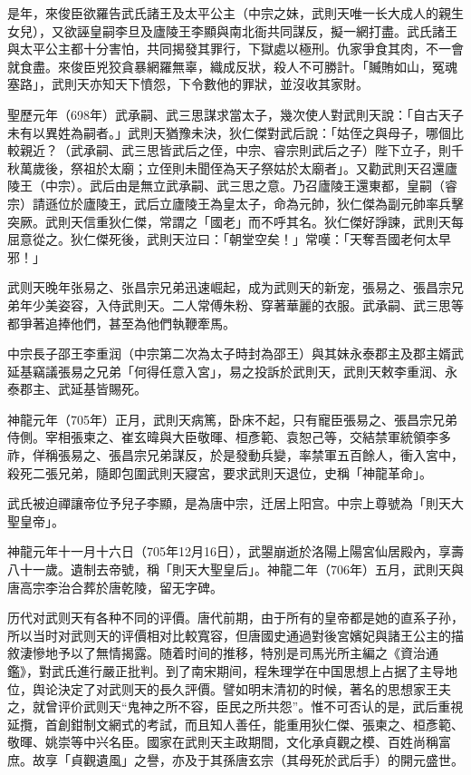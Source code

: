 是年，來俊臣欲羅告武氏諸王及太平公主（中宗之妹，武則天唯一长大成人的親生女兒），又欲誣皇嗣李旦及廬陵王李顯與南北衙共同謀反，擬一網打盡。武氏諸王與太平公主都十分害怕，共同揭發其罪行，下獄處以極刑。仇家爭食其肉，不一會就食盡。來俊臣兇狡貪暴網羅無辜，織成反狀，殺人不可勝計。「贓賄如山，冤魂塞路」，武則天亦知天下憤怨，下令數他的罪狀，並沒收其家財。

聖歷元年（698年）武承嗣、武三思謀求當太子，幾次使人對武則天說：「自古天子未有以異姓為嗣者。」武則天猶豫未決，狄仁傑對武后說：「姑侄之與母子，哪個比較親近？（武承嗣、武三思皆武后之侄，中宗、睿宗則武后之子）陛下立子，則千秋萬歲後，祭祖於太廟；立侄則未聞侄為天子祭姑於太廟者」。又勸武則天召還廬陵王（中宗）。武后由是無立武承嗣、武三思之意。乃召廬陵王還東都，皇嗣（睿宗）請遜位於廬陵王，武后立廬陵王為皇太子，命為元帥，狄仁傑為副元帥率兵擊突厥。武則天信重狄仁傑，常謂之「國老」而不呼其名。狄仁傑好諍諫，武則天每屈意從之。狄仁傑死後，武則天泣曰：「朝堂空矣！」常嘆：「天奪吾國老何太早邪！」

武则天晚年张易之、张昌宗兄弟迅速崛起，成为武则天的新宠，張易之、張昌宗兄弟年少美姿容，入侍武則天。二人常傅朱粉、穿著華麗的衣服。武承嗣、武三思等都爭著追捧他們，甚至為他們執鞭牽馬。

中宗長子邵王李重润（中宗第二次為太子時封為邵王）與其妹永泰郡主及郡主婿武延基竊議張易之兄弟「何得任意入宮」，易之投訴於武則天，武則天敕李重润、永泰郡主、武延基皆賜死。

神龍元年（705年）正月，武則天病篤，卧床不起，只有寵臣張易之、張昌宗兄弟侍側。宰相張柬之、崔玄暐與大臣敬暉、桓彥範、袁恕己等，交結禁軍統領李多祚，佯稱張易之、張昌宗兄弟謀反，於是發動兵變，率禁軍五百餘人，衝入宮中，殺死二張兄弟，隨即包圍武則天寢宮，要求武則天退位，史稱「神龍革命」。

武氏被迫禪讓帝位予兒子李顯，是為唐中宗，迁居上阳宫。中宗上尊號為「則天大聖皇帝」。

神龍元年十一月十六日（705年12月16日），武曌崩逝於洛陽上陽宮仙居殿內，享壽八十一歲。遺制去帝號，稱「則天大聖皇后」。神龍二年（706年）五月，武則天與唐高宗李治合葬於唐乾陵，留无字碑。

历代对武则天有各种不同的评價。唐代前期，由于所有的皇帝都是她的直系子孙，所以当时对武则天的评價相对比較寬容，但唐國史通過對後宮嬪妃與諸王公主的描敘淒慘地予以了無情揭露。随着时间的推移，特別是司馬光所主編之《資治通鑑》，對武氏進行嚴正批判。到了南宋期间，程朱理学在中国思想上占据了主导地位，舆论決定了对武则天的長久評價。譬如明末清初的时候，著名的思想家王夫之，就曾评价武则天“鬼神之所不容，臣民之所共怨”。惟不可否认的是，武后重視延攬，首創鉗制文網式的考試，而且知人善任，能重用狄仁傑、張柬之、桓彥範、敬暉、姚崇等中兴名臣。國家在武則天主政期間，文化承貞觀之模、百姓尚稱富庶。故享「貞觀遺風」之譽，亦及于其孫唐玄宗（其母死於武后手）的開元盛世。

